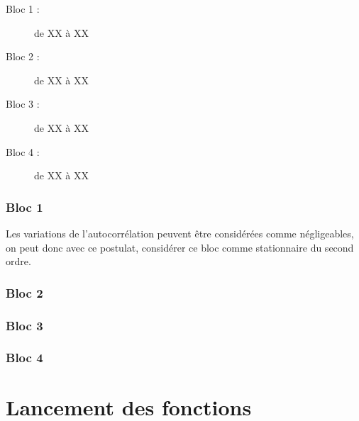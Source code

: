 \documentclass[french, a4paper, 12pt, openany]{book}
\begin{document}
  \begin{description}
    \item[Bloc 1 : ]de XX à XX
    \item[Bloc 2 : ]de XX à XX
    \item[Bloc 3 : ]de XX à XX
    \item[Bloc 4 : ]de XX à XX
  \end{description}
  \subsection{Bloc 1}
	Les variations de l'autocorrélation peuvent être considérées comme négligeables, on peut donc avec ce postulat, considérer ce bloc comme stationnaire du second ordre.
  \subsection{Bloc 2}
  \subsection{Bloc 3}
  \subsection{Bloc 4}

\chapter{Lancement des fonctions}
\end{document}

